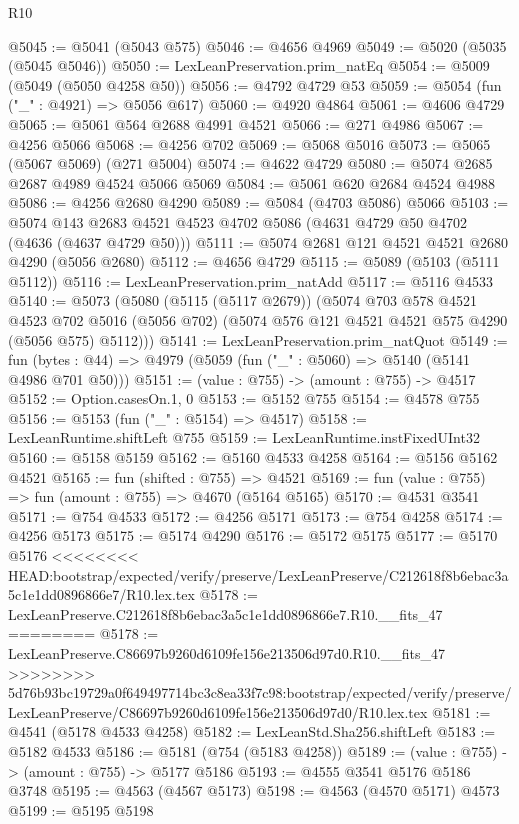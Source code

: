\begin{lexlean}{R10}
\begin{coremodule}
{{{{{{{{{{{{{{{{{{{{{{{{{{{{{{{{{{{{{{{{{{{{{{{{{{{{{{{{{{{{{{{{{{{{{{{{{{{{{{{{{{{{{{{{{{{{{{{{{{{{{{{{{{{{@5045 := @5041 (@5043 @575)
@5046 := @4656 @4969
@5049 := @5020 (@5035 (@5045 @5046))
@5050 := LexLeanPreservation.prim_natEq
@5054 := @5009 (@5049 (@5050 @4258 @50))
@5056 := @4792 @4729 @53
@5059 := @5054 (fun ("_" : @4921) => @5056 @617)
@5060 := @4920 @4864
@5061 := @4606 @4729
@5065 := @5061 @564 @2688 @4991 @4521
@5066 := @271 @4986
@5067 := @4256 @5066
@5068 := @4256 @702
@5069 := @5068 @5016
@5073 := @5065 (@5067 @5069) (@271 @5004)
@5074 := @4622 @4729
@5080 := @5074 @2685 @2687 @4989 @4524 @5066 @5069
@5084 := @5061 @620 @2684 @4524 @4988
@5086 := @4256 @2680 @4290
@5089 := @5084 (@4703 @5086) @5066
@5103 := @5074 @143 @2683 @4521 @4523 @4702 @5086 (@4631 @4729 @50 @4702 (@4636 (@4637 @4729 @50)))
@5111 := @5074 @2681 @121 @4521 @4521 @2680 @4290 (@5056 @2680)
@5112 := @4656 @4729
@5115 := @5089 (@5103 (@5111 @5112))
@5116 := LexLeanPreservation.prim_natAdd
@5117 := @5116 @4533
@5140 := @5073
    (@5080
      (@5115 (@5117 @2679))
      (@5074
        @703
        @578
        @4521
        @4523
        @702
        @5016
        (@5056 @702)
        (@5074 @576 @121 @4521 @4521 @575 @4290 (@5056 @575) @5112)))
@5141 := LexLeanPreservation.prim_natQuot
@5149 := fun (bytes : @44) => @4979 (@5059 (fun ("_" : @5060) => @5140 (@5141 @4986 @701 @50)))
@5151 := (value : @755) -> (amount : @755) -> @4517
@5152 := Option.casesOn.{1, 0}
@5153 := @5152 @755
@5154 := @4578 @755
@5156 := @5153 (fun ("_" : @5154) => @4517)
@5158 := LexLeanRuntime.shiftLeft @755
@5159 := LexLeanRuntime.instFixedUInt32
@5160 := @5158 @5159
@5162 := @5160 @4533 @4258
@5164 := @5156 @5162 @4521
@5165 := fun (shifted : @755) => @4521
@5169 := fun (value : @755) => fun (amount : @755) => @4670 (@5164 @5165)
@5170 := @4531 @3541
@5171 := @754 @4533
@5172 := @4256 @5171
@5173 := @754 @4258
@5174 := @4256 @5173
@5175 := @5174 @4290
@5176 := @5172 @5175
@5177 := @5170 @5176
<<<<<<<< HEAD:bootstrap/expected/verify/preserve/LexLeanPreserve/C212618f8b6ebac3a5c1e1dd0896866e7/R10.lex.tex
@5178 := LexLeanPreserve.C212618f8b6ebac3a5c1e1dd0896866e7.R10.__fits_47
========
@5178 := LexLeanPreserve.C86697b9260d6109fe156e213506d97d0.R10.__fits_47
>>>>>>>> 5d76b93bc19729a0f649497714bc3c8ea33f7c98:bootstrap/expected/verify/preserve/LexLeanPreserve/C86697b9260d6109fe156e213506d97d0/R10.lex.tex
@5181 := @4541 (@5178 @4533 @4258)
@5182 := LexLeanStd.Sha256.shiftLeft
@5183 := @5182 @4533
@5186 := @5181 (@754 (@5183 @4258))
@5189 := (value : @755) -> (amount : @755) -> @5177 @5186
@5193 := @4555 @3541 @5176 @5186 @3748
@5195 := @4563 (@4567 @5173)
@5198 := @4563 (@4570 @5171) @4573
@5199 := @5195 @5198
}}}}}}}}}}}}}}}}}}}}}}}}}}}}}}}}}}}}}}}}}}}}}}}}}}}}}}}}}}}}}}}}}}}}}}}}}}}}}}}}}}}}}}}}}}}}}}}}}}}}}}}}}}}}
\end{coremodule}
\end{lexlean}
